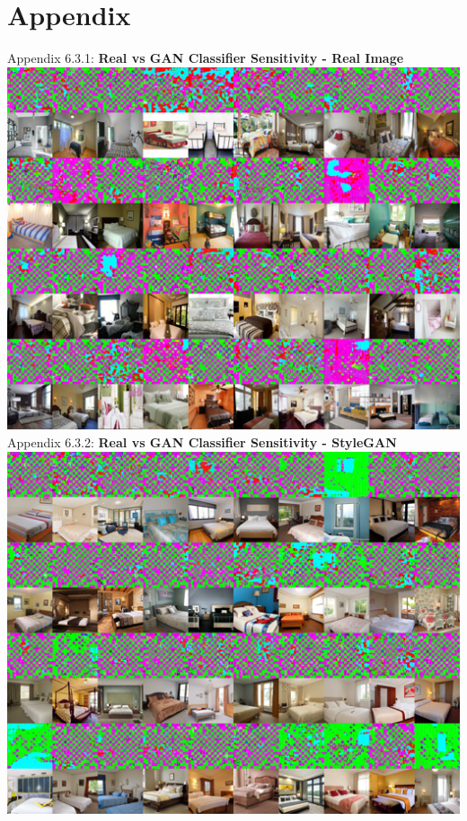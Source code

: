 \documentclass[10pt]{article}
\begin{document}
    \newpage
    \section{Appendix}
    Appendix 6.3.1: \textbf{Real vs GAN Classifier Sensitivity - Real Image}\\
    \includegraphics[scale=1.05]{smoothgrad-big/combined_model/testing-3-2-combined-dataset-raw-smoothgrad.png}\\
    Appendix 6.3.2: \textbf{Real vs GAN Classifier Sensitivity - StyleGAN}\\
    \includegraphics[scale=1.05]{smoothgrad-big/combined_model/testing-3-2-combined-dataset-stylegan-smoothgrad.png}
\end{document}
